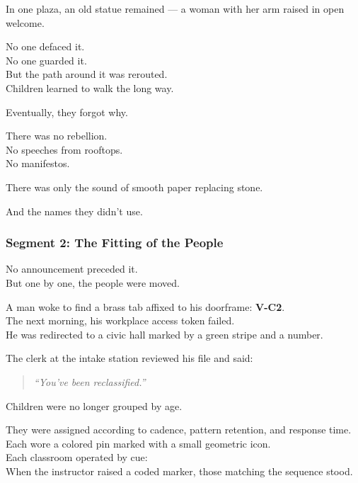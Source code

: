 \documentclass[9pt]{article}
\begin{document}
\vspace{1em}

In one plaza, an old statue remained — a woman with her arm raised in open welcome.

No one defaced it.\\
No one guarded it.\\
But the path around it was rerouted.\\
Children learned to walk the long way.

Eventually, they forgot why.

\vspace{1em}

There was no rebellion.\\
No speeches from rooftops.\\
No manifestos.

There was only the sound of smooth paper replacing stone.

And the names they didn’t use.

\newpage

\subsubsection*{Segment 2: The Fitting of the People}

No announcement preceded it.\\
But one by one, the people were moved.

A man woke to find a brass tab affixed to his doorframe: \textbf{V-C2}.\\
The next morning, his workplace access token failed.\\
He was redirected to a civic hall marked by a green stripe and a number.

The clerk at the intake station reviewed his file and said:

\begin{quote}
\textit{“You’ve been reclassified.”}
\end{quote}

\vspace{1em}

Children were no longer grouped by age.

They were assigned according to cadence, pattern retention, and response time.\\
Each wore a colored pin marked with a small geometric icon.\\
Each classroom operated by cue:\\
When the instructor raised a coded marker, those matching the sequence stood.
\end{document}
